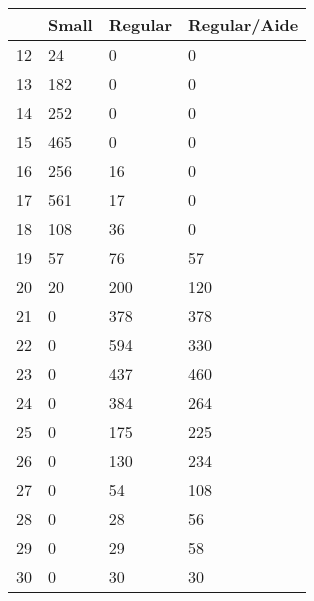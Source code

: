 \begin{table}[htbp]
\begin{tabular}{llll} \hline \hline
 & Small  & Regular  & Regular/Aide  \\  \hline 
12 & 24 & 0 & 0 \\  
13 & 182 & 0 & 0 \\  
14 & 252 & 0 & 0 \\  
15 & 465 & 0 & 0 \\  
16 & 256 & 16 & 0 \\  
17 & 561 & 17 & 0 \\  
18 & 108 & 36 & 0 \\  
19 & 57 & 76 & 57 \\  
20 & 20 & 200 & 120 \\  
21 & 0 & 378 & 378 \\  
22 & 0 & 594 & 330 \\  
23 & 0 & 437 & 460 \\  
24 & 0 & 384 & 264 \\  
25 & 0 & 175 & 225 \\  
26 & 0 & 130 & 234 \\  
27 & 0 & 54 & 108 \\  
28 & 0 & 28 & 56 \\  
29 & 0 & 29 & 58 \\  
30 & 0 & 30 & 30 \\  
\hline \hline \end{tabular}
\end{table}
